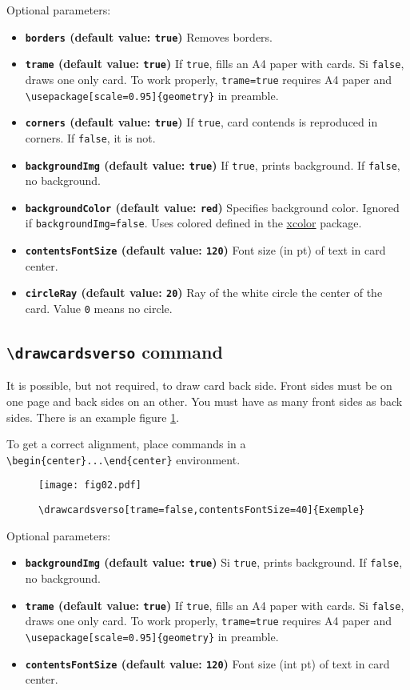 \documentclass[a4paper, 12pt]{article}
\newcommand{\key}[3]{\textbf{\texttt{#1} (default value: \texttt{#2})} #3}
\newcommand{\commande}[1]{\texttt{\textbackslash#1}}
\begin{document}
Optional parameters:
\begin{itemize}
	\item \key{borders}{true}{Removes borders.}
	\item \key{trame}{true}{If \texttt{true}, fills an A4 paper with cards. Si \texttt{false}, draws one only card. To work properly, \texttt{trame=true} requires A4 paper and \commande{usepackage[scale=0.95]\{geometry\}} in preamble.}
	\item \key{corners}{true}{If \texttt{true}, card contends is reproduced in corners. If \texttt{false}, it is not.}
	\item \key{backgroundImg}{true}{If \texttt{true}, prints background. If \texttt{false}, no background.}
	\item \key{backgroundColor}{red}{Specifies background color. Ignored if \texttt{backgroundImg=false}. Uses colored defined in the \href{https://www.ctan.org/pkg/xcolor}{xcolor} package.}
	\item \key{contentsFontSize}{120}{Font size (in pt) of text in card center.}
	\item \key{circleRay}{20}{Ray of the white circle the center of the card. Value \texttt 0 means no circle.}
\end{itemize}


	\subsection{\commande{drawcardsverso} command}
It is possible, but not required, to draw card back side. Front sides must be on one page and back sides on an other. You must have as many front sides as back sides. There is an example figure \ref{fig:verso}.

To get a correct alignment, place commands in a  \verb!\begin{center}...\end{center}! environment.
\begin{figure}[h]\begin{center}
	\caption{\commande{drawcardsverso[trame=false,contentsFontSize=40]\{Exemple\}}}
	\texttt{[image: fig02.pdf]}\label{fig:verso}
\end{center}\end{figure}

Optional parameters:
\begin{itemize}
	\item \key{backgroundImg}{true}{Si \texttt{true}, prints background. If \texttt{false}, no background.}
	\item \key{trame}{true}{If \texttt{true}, fills an A4 paper with cards. Si \texttt{false}, draws one only card. To work properly, \texttt{trame=true} requires A4 paper and \commande{usepackage[scale=0.95]\{geometry\}} in preamble.}
	\item \key{contentsFontSize}{120}{Font size (int pt) of text in card center.}
\end{itemize}
\end{document}
